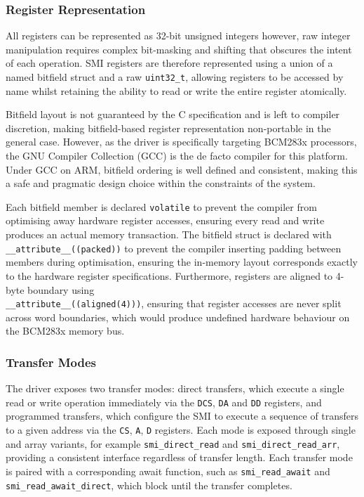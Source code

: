 \documentclass[final]{cmpreport}
\begin{document}
\subsubsection{Register Representation}
All registers can be represented as 32-bit unsigned integers however, raw integer manipulation requires complex bit-masking and shifting that obscures the intent of each operation. SMI registers are therefore represented using a union of a named bitfield struct and a raw \texttt{uint32\_t}, allowing registers to be accessed by name whilst retaining the ability to read or write the entire register atomically. 

Bitfield layout is not guaranteed by the C specification and is left to compiler discretion, making bitfield-based register representation non-portable in the general case. However, as the driver is specifically targeting BCM283x processors, the GNU Compiler Collection (GCC) is the de facto compiler for this platform. Under GCC on ARM, bitfield ordering is well defined and consistent, making this a safe and pragmatic design choice within the constraints of the system.

Each bitfield member is declared \texttt{volatile} to prevent the compiler from optimising away hardware register accesses, ensuring every read and write produces an actual memory transaction. The bitfield struct is declared with \texttt{\_\_attribute\_\_((packed))} to prevent the compiler inserting padding between members during optimisation, ensuring the in-memory layout corresponds exactly to the hardware register specifications. Furthermore, registers are aligned to 4-byte boundary using \\ \texttt{\_\_attribute\_\_((aligned(4)))}, ensuring that register accesses are never split across word boundaries, which would produce undefined hardware behaviour on the BCM283x memory bus.

\subsubsection{Transfer Modes}
The driver exposes two transfer modes: direct transfers, which execute a single read or write operation immediately via the \texttt{DCS}, \texttt{DA} and \texttt{DD} registers, and programmed transfers, which configure the SMI to execute a sequence of transfers to a given address via the \texttt{CS}, \texttt{A}, \texttt{D} registers. Each mode is exposed through single and array variants, for example \texttt{smi\_direct\_read} and \texttt{smi\_direct\_read\_arr}, providing a consistent interface regardless of transfer length. Each transfer mode is paired with a corresponding await function, such as \texttt{smi\_read\_await} and \texttt{smi\_read\_await\_direct}, which block until the transfer completes.
\end{document}
